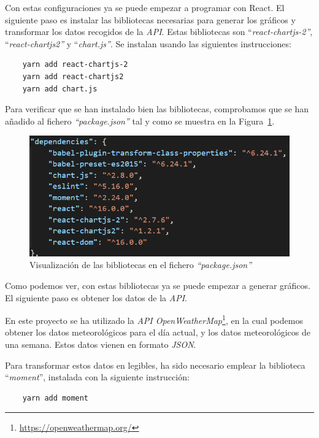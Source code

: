 \documentclass[a4paper, 12pt]{book}
\begin{document}
Con estas configuraciones ya se puede empezar a programar con React. El siguiente paso es instalar las bibliotecas necesarias para generar los gráficos y transformar los datos recogidos de la \textit{API}. Estas bibliotecas son ``\textit{react-chartjs-2''}, ``\textit{react-chartjs2''} y ``\textit{chart.js''}. Se instalan usando las siguientes instrucciones: 
\begin{verbatim}
    yarn add react-chartjs-2
    yarn add react-chartjs2
    yarn add chart.js
\end{verbatim} 
Para verificar que se han instalado bien las bibliotecas, comprobamos que se han añadido al fichero \textit{``package.json''} tal y como se muestra en la Figura~\ref{fig:package_chart}.
\begin{figure}[h]
  \centering
  \includegraphics{img_usadas/package_chart.png}
  \caption{Visualización de las bibliotecas en el fichero \textit{``package.json''}}
  \label{fig:package_chart}
\end{figure}

Como podemos ver, con estas bibliotecas ya se puede empezar a generar gráficos. El siguiente paso es obtener los datos de la \textit{API}. 

En este proyecto se ha utilizado la \textit{API OpenWeatherMap}\footnote{\url{https://openweathermap.org/}}, en la cual podemos obtener los datos meteorológicos para el día actual, y los datos meteorológicos de una semana.
Estos datos vienen en formato \textit{JSON}.

\vspace{5mm}
Para transformar estos datos en legibles, ha sido necesario emplear la biblioteca ``\textit{moment}'', instalada con la siguiente instrucción: 
\begin{verbatim}
    yarn add moment
\end{verbatim} 
\end{document}
